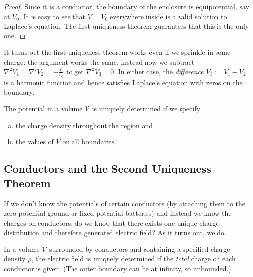 \begin{proof}
Since it is a conductor, the boundary of the enclosure is equipotential, say at $V_0$. It is easy to see that $V=V_0$ everywhere inside is a valid solution to Laplace's equation. The first uniqueness theorem guarantees that this is the only one.
\end{proof}

It turns out the first uniqueness theorem works even if we sprinkle in some charge: the argument works the same, instead now we subtract $\nabla^2V_1=\nabla^2V_2=-\frac{\rho}{\varepsilon_0}$ to get $\nabla^2V_3=0$. In either case, the \textit{difference} $V_3:=V_1-V_2$ is a harmonic function and hence satisfies Laplace's equation with zeros on the boundary.

\begin{corollary}
The potential in a volume $\mathcal{V}$ is uniquely determined if we specify  
\begin{enumerate}[(a)]
    \item the charge density throughout the region and
    \item the values of $V$ on all boundaries.
\end{enumerate}
\end{corollary}

\subsection{Conductors and the Second Uniqueness Theorem}

If we don't know the potentials of certain conductors (by attaching them to the zero potential ground or fixed potential batteries) and instead we know the charges on conductors, do we know that there exists one unique charge distribution and therefore generated electric field? As it turns out, we do.

\begin{theorem}
    In a volume $\mathcal{V}$ surrounded by conductors and containing a specified charge density $\rho$, the electric field is uniquely determined if the \textit{total} charge on each conductor is given. (The outer boundary can be at infinity, so unbounded.)
\end{theorem}


